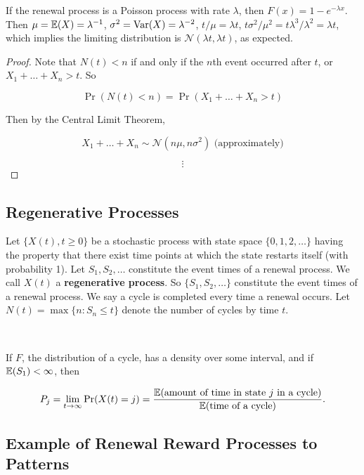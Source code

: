 \begin{remark}If the renewal process is a Poisson process with rate \(\lambda\), then \(F(x) = 1 - e^{-\lambda x}\). Then \(\mu = \mathbb{E}(X) = \lambda^{-1}\), \(\sigma^2 = \mathrm{Var}(X) = \lambda^{-2}\), \(t/\mu = \lambda t\), \(t \sigma^2/\mu^2 = t \lambda^3/\lambda^2 = \lambda t\), which implies the limiting distribution is \(\mathcal{N}(\lambda t, \lambda t)\), as expected.

\end{remark}


\begin{proof} Note that \(N(t) < n \) if and only if the \(n\)th event occurred after \(t\), or \(X_1 + \ldots + X_n > t\). So

\[
\Pr(N(t) < n) = \Pr(X_1 + \ldots + X_n > t) 
\]

Then by the Central Limit Theorem, 

\[
X_1 + \ldots + X_n \sim \mathcal{N}(n \mu, n \sigma^2) \text{ (approximately)}
\]

\[
\vdots
\]

\end{proof}

\subsection{Regenerative Processes}

\begin{theorem} Let \(\{X(t), t \geq 0\}\) be a stochastic process with state space \(\{0, 1, 2, \ldots\}\) having the property that there exist time points at which the state restarts itself (with probability 1). Let \(S_1, S_2, \ldots\) constitute the event times of a renewal process. We call \(X(t)\) a \textbf{regenerative process}. So \(\{S_1, S_2, \ldots \}\) constitute the event times of a renewal process. We say a cycle is completed every time a renewal occurs. Let \(N(t) = \max \{n: S_n \leq t\}\) denote the number of cycles by time \(t\).

\

If \(F\), the distribution of a cycle, has a density over some interval, and if \(\mathbb{E}(S_1) < \infty\), then

\[
P_j = \lim_{t \to \infty} \Pr(X(t) = j) = \frac{\mathbb{E}(\text{amount of time in state } j \text{ in a cycle})}{\mathbb{E}(\text{time of a cycle})}.
\]

\end{theorem}

\subsection{Example of Renewal Reward Processes to Patterns}

